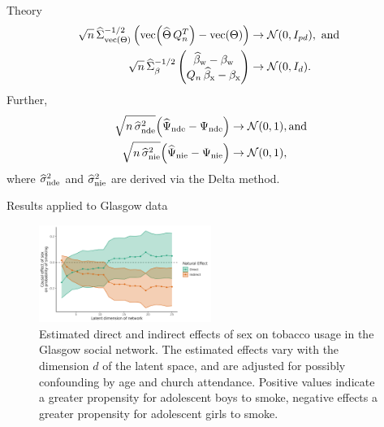 \documentclass[final]{beamer}
\newlength{\colwidth}
\begin{document}
\begin{frame}[t]
\begin{columns}[t]
\begin{column}{\colwidth}
\begin{exampleblock}{Theory}
        \begin{equation*}
          \begin{aligned}
            \sqrt{ n } \,
            \Sigmahattheta^{-1/2}
            \begin{pmatrix}
              \vecc \paren*{\Thetahat \, Q_n^T} - \Thetavec
            \end{pmatrix}
             & \to
            \Normal{0}{I_{p d}}, \text{ and } \\
            \sqrt{ n } \,
            \Sigmahatbeta^{-1/2}
            \begin{pmatrix}
              \betawhat - \betaw \\
              Q_n \, \betaxhat - \betax
            \end{pmatrix}
             & \to
            \Normal{0}{I_d}.
          \end{aligned}
        \end{equation*}
        Further,
        \begin{align*}
          \sqrt{n \, \sigmahatnde} \paren*{\ndehat - \nde}
           & \to
          \Normal{0}{1}, \text{and} \\
          \sqrt{n \, \sigmahatnie} \paren*{\niehat - \nie}
           & \to
          \Normal{0}{1},
        \end{align*}
        where $\widehat{\sigma}^2_\mathrm{nde}$ and $\widehat{\sigma}^2_\mathrm{nie}$ are derived via the Delta method.

      \end{exampleblock}

      \begin{block}{Results applied to Glasgow data}

        \begin{figure}[ht!]
          \centering
          \includegraphics[width=0.5\textwidth]{figures/glasgow/effects.png}
          \caption{Estimated direct and indirect effects of sex on tobacco usage in the Glasgow social network. The estimated effects vary with the dimension $d$ of the latent space, and are adjusted for possibly confounding by age and church attendance. Positive values indicate a greater propensity for adolescent boys to smoke, negative effects a greater propensity for adolescent girls to smoke.}
          \label{fig:glasgow-estimates}
        \end{figure}


\end{block}
\end{column}
\end{columns}
\end{frame}
\end{document}
